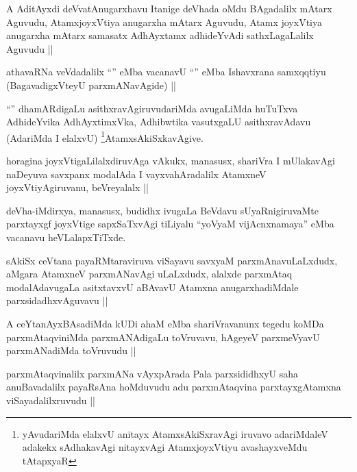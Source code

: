\begin{artha}
A AditAyxdi deVvatAnugarxhavu Itanige deVhada oMdu BAgadalilx mAtarx Aguvudu, AtamxjoyxVtiya anugarxha mAtarx Aguvudu, Atamx joyxVtiya anugarxha mAtarx samasatx AdhAyxtamx adhideYvAdi sathxLagaLalilx Aguvudu || 
\end{artha}

\begin{artha}
athavaRNa veVdadalilx ``\stext'' eMba vacanavU ``\stext'' eMba Ishavxrana samxqqtiyu (BagavadigxVteyU parxmANavAgide) ||
\end{artha}

\begin{artha}
``\stext'' dhamARdigaLu asithxravAgiruvudariMda avugaLiMda huTuTxva AdhideYvika AdhAyxtimxVka, Adhibwtika vasutxgaLU asithxravAdavu (AdariMda I elalxvU) \footnote{yAvudariMda elalxvU anitayx AtamxsAkiSxravAgi iruvavo adariMdaleV adakekx sAdhakavAgi nitayxvAgi AtamxjoyxVtiyu avashayxveMdu tAtapxyaR}AtamxsAkiSxkavAgive.
\end{artha}

\begin{artha}
horagina joyxVtigaLilalxdiruvAga vAkukx, manasusx, shariVra I mUlakavAgi naDeyuva savxpanx modalAda I vayxvahAradalilx AtamxneV joyxVtiyAgiruvanu, beVreyalalx ||
\end{artha}

\begin{artha}
deVha-iMdirxya, manasusx, budidhx ivugaLa BeVdavu sUyaRnigiruvaMte parxtayxgf joyxVtige sapxSaTxvAgi tiLiyalu ``yoV\s yaM vijAcnxnamaya'' eMba vacanavu heVLalapxTiTxde.
\end{artha}

\begin{artha}
sAkiSx ceVtana payaRMtaraviruva viSayavu savxyaM parxmAnavuLaLxdudx, aMgara AtamxneV parxmANavAgi uLaLxdudx, alalxde parxmAtaq modalAdavugaLa asitxtavxvU aBAvavU Atamxna anugarxhadiMdale parxsidadhxvAguvavu ||
\end{artha}

\begin{artha}
A ceYtanAyxBAsadiMda kUDi ahaM eMba shariVravanunx tegedu koMDa parxmAtaqviniMda parxmANAdigaLu toVruvavu, hAgeyeV parxmeVyavU parxmANadiMda toVruvudu ||
\end{artha}

\begin{artha}
parxmAtaqvinalilx parxmANa vAyxpArada Pala parxsididhxyU saha anuBavadalilx payaRsAna hoMduvudu adu parxmAtaqvina parxtayxgAtamxna viSayadalilxruvudu ||
\end{artha}

